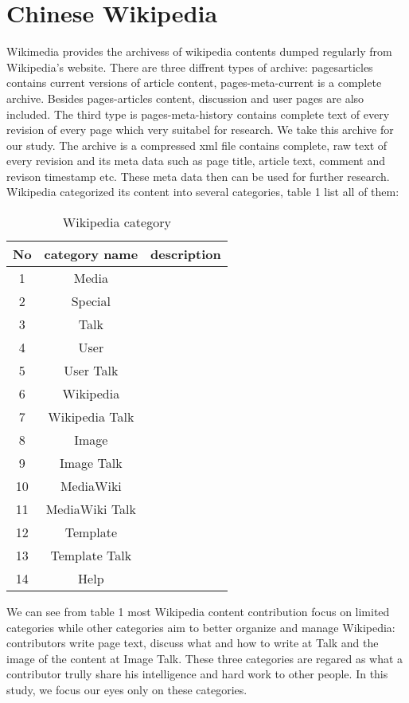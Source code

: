 \documentclass{elsarticle}
\begin{document}
\section{Chinese Wikipedia}
\label{sec:introduction-1}
Wikimedia provides the archivess of  wikipedia contents dumped
regularly from
Wikipedia's website.  There are three diffrent types of archive: 
pages\nobreakdash{-}articles contains current versions of article content,
pages-meta-current is  a   complete archive. Besides pages-articles
content, discussion and user pages are also included.  The third type
is pages-meta-history contains complete text of every revision of
every page which very suitabel  for research. We take this archive for
our study. The archive is a
compressed xml file  contains complete, raw text of every revision and
its meta data such as page title, article text, comment and revison
timestamp etc. These meta data then can be used for further research.
Wikipedia categorized its content into several categories, table 1
list all of them:
\begin{table}
 \centering
 \caption{Wikipedia category}
  \begin{tabular}[center]{|c|c|c|}
  \hline
  No  & category name  & description \\
  \hline
   1 & Media & \\\hline 
  2 &Special & \\\hline
  3 & Talk & \\\hline
  4 &  User  & \\\hline
  5 & User Talk & \\\hline
  6 & Wikipedia  & \\\hline
  7 & Wikipedia Talk & \\\hline
  8 &  Image & \\\hline
  9 & Image Talk & \\\hline
  10 &  MediaWiki& \\\hline
  11 & MediaWiki Talk& \\\hline
12 & Template& \\\hline
13 & Template Talk& \\\hline
14 & Help& \\\hline
  \end{tabular}
\end{table}
We can see from table 1 most Wikipedia content contribution focus on
limited categories while other categories aim to better organize and
manage Wikipedia: contributors write page text, discuss what and how
to write at Talk and  the image of the content at Image Talk. These
three categories are regared as what a contributor trully share his
intelligence and hard work to other people. In this study, we focus
our eyes only on these categories. 
\end{document}
